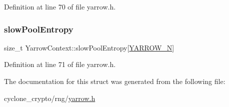 Definition at line 70 of file yarrow.\+h.

\mbox{\label{structYarrowContext_a295ac4bb5a95ce6237ad0b6a9776eff9}} 
\subsubsection{\texorpdfstring{slow\+Pool\+Entropy}{slowPoolEntropy}}
{\footnotesize\ttfamily size\+\_\+t Yarrow\+Context\+::slow\+Pool\+Entropy\mbox{[}\hyperlink{yarrow_8h_a26ee6536b9ff794ba4a21956c7dc44a5}{Y\+A\+R\+R\+O\+W\+\_\+N}\mbox{]}}



Definition at line 71 of file yarrow.\+h.



The documentation for this struct was generated from the following file\+:\begin{DoxyCompactItemize}
\item 
cyclone\+\_\+crypto/rng/\hyperlink{yarrow_8h}{yarrow.\+h}\end{DoxyCompactItemize}
